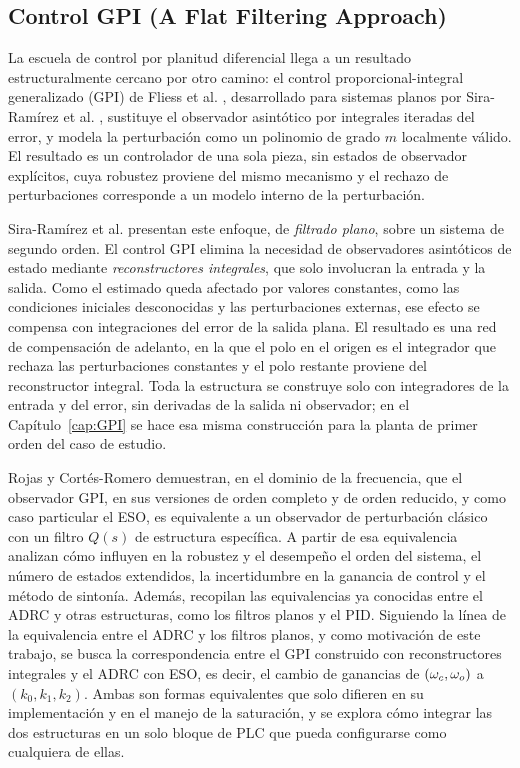 \subsection{Control GPI (A Flat Filtering Approach)}

La escuela de control por planitud diferencial llega a un resultado
estructuralmente cercano por otro camino: el control proporcional-integral
generalizado (GPI) de Fliess et al. \cite{fliess2002gpi}, desarrollado para
sistemas planos por Sira-Ramírez et al. \cite{sira2017adrc}, sustituye el
observador asintótico por integrales iteradas del error, y modela la
perturbación como un polinomio de grado $m$ localmente válido. El resultado es
un controlador de una sola pieza, sin estados de observador explícitos, cuya
robustez proviene del mismo mecanismo y el rechazo de perturbaciones corresponde
a un modelo interno de la perturbación.

Sira-Ramírez et al. \cite[sec.~3.4.3]{sira2017adrc} presentan este enfoque, de
\emph{filtrado plano}, sobre un sistema de segundo orden. El control GPI elimina la necesidad de
observadores asintóticos de estado mediante \emph{reconstructores integrales}, que solo involucran
la entrada y la salida. Como el estimado queda afectado por valores constantes, como las
condiciones iniciales desconocidas y las perturbaciones externas, ese efecto se compensa con
integraciones del error de la salida plana. El resultado es una red de compensación de adelanto, en
la que el polo en el origen es el integrador que rechaza las perturbaciones constantes y el polo
restante proviene del reconstructor integral. Toda la estructura se construye solo con integradores
de la entrada y del error, sin derivadas de la salida ni observador; en el
Capítulo~\ref{cap:GPI} se hace esa misma construcción para la planta de primer orden del caso de
estudio.

Rojas y Cortés-Romero \cite{rojas2020equivalence} demuestran, en el dominio
de la frecuencia, que el observador GPI, en sus versiones de orden completo y
de orden reducido, y como caso particular el ESO, es equivalente a un
observador de perturbación clásico con un filtro $Q(s)$ de estructura
específica. A partir de esa equivalencia analizan cómo influyen en la robustez
y el desempeño el orden del sistema, el número de estados extendidos, la
incertidumbre en la ganancia de control y el método de sintonía. Además,
recopilan las equivalencias ya conocidas entre el ADRC y otras estructuras,
como los filtros planos y el PID. Siguiendo la línea de la equivalencia entre
el ADRC y los filtros planos, y como motivación de este trabajo, se busca la correspondencia entre el GPI construido con
reconstructores integrales y el ADRC con ESO, es decir, el cambio de
ganancias de $(\omega_{c},\omega_{o})$ a $(k_0,k_1,k_2)$. Ambas son formas
equivalentes que solo difieren en su implementación y en el manejo de la
saturación, y se explora cómo integrar las dos estructuras en un solo bloque de
PLC que pueda configurarse como cualquiera de ellas.

